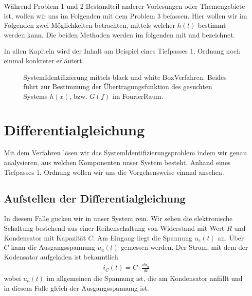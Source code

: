 \documentclass[letterpaper,10pt,english]{jupyterBook}
\let\sphinxpxdimen\pdfpxdimen\else\newdimen\sphinxpxdimen
\begin{document}
\sphinxAtStartPar
Während Problem 1 und 2 Bestandteil anderer Vorlesungen oder Themengebiete ist, wollen wir uns im Folgenden mit dem Problem 3 befassen. Hier wollen wir im Folgenden zwei Möglichkeiten betrachten, mittels welcher \(h(t)\) bestimmt werden kann. Die beiden Methoden werden im folgenden mit  und  bezeichnet.

\sphinxAtStartPar
In allen Kapiteln wird der Inhalt am Beispiel eines Tiefpasses 1. Ordnung noch einmal konkreter erläutert.

\begin{figure}[htbp]
\centering
\capstart

\noindent\sphinxincludegraphics[width=800\sphinxpxdimen]{{black_white_box}.jpg}
\caption{System\sphinxhyphen{}Identifizierung mittels black und white Box\sphinxhyphen{}Verfahren. Beides führt zur Bestimmung der Übertragungsfunktion des gesuchten Systems \(h(x)\), bzw. \(G(f)\) im Fourier\sphinxhyphen{}Raum.}\label{\detokenize{content/5_LTI:black-white-box}}\end{figure}

\sphinxstepscope


\section{Differentialgleichung}
\label{\detokenize{content/5_DGL:differentialgleichung}}\label{\detokenize{content/5_DGL::doc}}
\sphinxAtStartPar
Mit dem \sphinxhyphen{}Verfahren lösen wir das System\sphinxhyphen{}Identifizierungsproblem indem wir genau analysieren, aus welchen Komponenten unser System besteht. Anhand eines Tiefpasses 1. Ordnung wollen wir uns die Vorgehensweise einmal ansehen.


\subsection{Aufstellen der Differentialgleichung}
\label{\detokenize{content/5_DGL:aufstellen-der-differentialgleichung}}
\sphinxAtStartPar

In diesem Falle gucken wir in unser System rein. Wir sehen die elektronische Schaltung bestehend aus einer Reihenschaltung von Widerstand mit Wert \(R\) und Kondensator mit Kapazität \(C\). Am Eingang liegt die Spannung \(u_e(t)\) an. Über \(C\) kann die Ausgangsspannung \(u_a(t)\) gemessen werden. Der Strom, mit dem der Kodensator aufgeladen ist bekanntlich
\begin{equation*}
\begin{split}i_C(t) = C\cdot \frac{du_a}{dt}\end{split}
\end{equation*}
\sphinxAtStartPar
wobei \(u_a(t)\) im allgemeinen die Spannung ist, die am Kondensator anfällt und in diesem Falle gleich der Ausgangsspannung ist.
\end{document}
